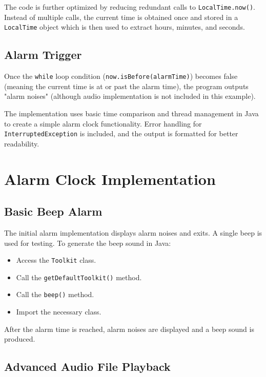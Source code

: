 \documentclass{article}
\begin{document}
\begin{itemize}
The code is further optimized by reducing redundant calls to \texttt{LocalTime.now()}. Instead of multiple calls, the current time is obtained once and stored in a \texttt{LocalTime} object which is then used to extract hours, minutes, and seconds.


\subsection{Alarm Trigger}

Once the \texttt{while} loop condition (\texttt{now.isBefore(alarmTime)}) becomes false (meaning the current time is at or past the alarm time), the program outputs "alarm noises" (although audio implementation is not included in this example).


The implementation uses basic time comparison and thread management in Java to create a simple alarm clock functionality.  Error handling for \texttt{InterruptedException} is included, and the output is formatted for better readability.


\section{Alarm Clock Implementation}

\subsection{Basic Beep Alarm}

The initial alarm implementation displays alarm noises and exits.  A single beep is used for testing.  To generate the beep sound in Java:

\begin{itemize}
    \item Access the \texttt{Toolkit} class.
    \item Call the \texttt{getDefaultToolkit()} method.
    \item Call the \texttt{beep()} method.
    \item Import the necessary class.
\end{itemize}

After the alarm time is reached, alarm noises are displayed and a beep sound is produced.


\subsection{Advanced Audio File Playback}


\end{itemize}
\end{document}
